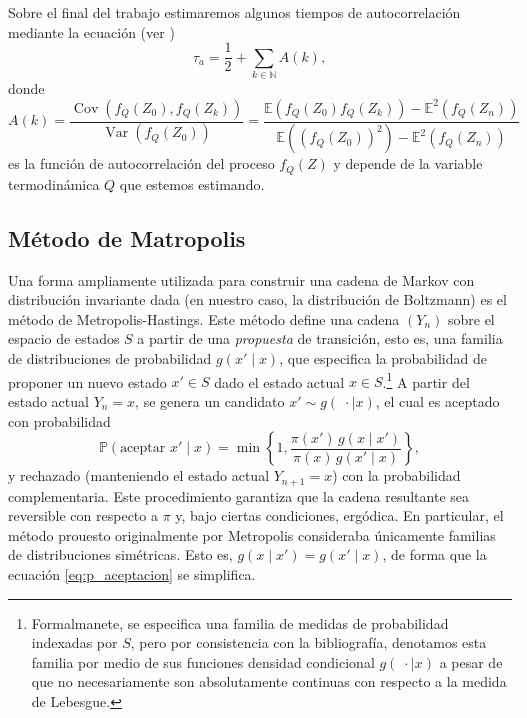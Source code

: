 \documentclass[a4paper,12pt]{article}
\newcommand{\N}{\mathbb{N}}
\newcommand{\var}{\operatorname{Var}}
\newcommand{\cov}{\operatorname{Cov}}
\newcommand{\E}{\mathbb{E}}
\renewcommand{\P}{\mathbb{P}}
\begin{document}
Sobre el final del trabajo estimaremos algunos tiempos de autocorrelación mediante la ecuación (ver \cite{janke2009statistical, schachinger2007mcmc})
\begin{equation}
    \label{eq:tiempo_de_autocorrelacion}
    \tau_a = \dfrac{1}{2} + \sum_{k \in \N} A(k),
\end{equation}
donde
\begin{equation}
    \label{eq:autocorrelacion}
    A(k) = \dfrac{\cov (f_Q(Z_0), f_Q(Z_k))}{\var (f_Q(Z_0))} = \dfrac{\E(f_Q(Z_0)f_Q(Z_k)) - \E^2(f_Q(Z_n))}{\E((f_Q(Z_0))^2) - \E^2(f_Q(Z_n))}
\end{equation}
es la función de autocorrelación del proceso $f_Q(Z)$ y depende de la variable termodinámica $Q$ que estemos estimando.

\subsection{Método de Matropolis}

Una forma ampliamente utilizada para construir una cadena de Markov con distribución invariante dada (en nuestro caso, la distribución de Boltzmann) es el método de Metropolis-Hastings. Este método define una cadena \( (Y_n) \) sobre el espacio de estados \( S \) a partir de una \emph{propuesta} de transición, esto es, una familia de distribuciones de probabilidad \( g(x' \mid x) \), que especifica la probabilidad de proponer un nuevo estado \( x' \in S \) dado el estado actual \( x \in S \).\footnote{Formalmanete, se especifica una familia de medidas de probabilidad indexadas por $S$, pero por consistencia con la bibliografía, denotamos esta familia por medio de sus funciones densidad condicional $g(\; \cdot \mid x)$ a pesar de que no necesariamente son absolutamente continuas con respecto a la medida de Lebesgue.} A partir del estado actual \( Y_n = x \), se genera un candidato \( x' \sim g(\; \cdot \mid x) \), el cual es aceptado con probabilidad
\begin{equation}
    \label{eq:p_aceptacion}
    \P(\text{aceptar } x' \mid x) = \min \left\{1, \frac{\pi(x')\, g(x \mid x')}{\pi(x)\, g(x' \mid x)} \right\},
\end{equation}
y rechazado (manteniendo el estado actual \( Y_{n+1} = x \)) con la probabilidad complementaria. Este procedimiento garantiza que la cadena resultante sea reversible con respecto a \( \pi \) y, bajo ciertas condiciones, ergódica. En particular, el método prouesto originalmente por Metropolis consideraba únicamente familias de distribuciones simétricas. Esto es, $g(x \mid x') = g(x' \mid x)$, de forma que la ecuación \eqref{eq:p_aceptacion} se simplifica.\\
\end{document}

